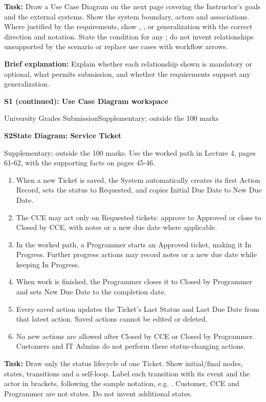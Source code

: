 \par\medskip
\textbf{Task:} Draw a Use Case Diagram on the next page covering the Instructor's goals and the external systems. Show the system boundary, actors and associations. Where justified by the requirements, show , , or generalization with the correct direction and notation. State the condition for any ; do not invent relationships unsupported by the scenario or replace use cases with workflow arrows.\par
\textbf{Brief explanation:} Explain whether each relationship shown is mandatory or optional, what permits submission, and whether the requirements support any generalization.\par
\blankbox{3.5cm}
\newpage
\textbf{\Large S1 (continued): Use Case Diagram workspace}\par
University Grades Submission\hfill Supplementary; outside the 100 marks\par
\blankbox{21.5cm}
\newpage
\textbf{\Large S2\quad State Diagram: Service Ticket}\par
Supplementary; outside the 100 marks. Use the worked path in Lecture 4, pages 61-62, with the supporting facts on pages 45-46.\par
\begin{enumerate}[itemsep=2pt]
\item When a new Ticket is saved, the System automatically creates its first Action Record, sets the status to Requested, and copies Initial Due Date to New Due Date.
\item The CCE may act only on Requested tickets: approve to Approved or close to Closed by CCE, with notes or a new due date where applicable.
\item In the worked path, a Programmer starts an Approved ticket, making it In Progress. Further progress actions may record notes or a new due date while keeping In Progress.
\item When work is finished, the Programmer closes it to Closed by Programmer and sets New Due Date to the completion date.
\item Every saved action updates the Ticket's Last Status and Last Due Date from that latest action. Saved actions cannot be edited or deleted.
\item No new actions are allowed after Closed by CCE or Closed by Programmer. Customers and IT Admins do not perform these status-changing actions.
\end{enumerate}
\textbf{Task:} Draw only the status lifecycle of one Ticket. Show initial/final nodes, states, transitions and a self-loop. Label each transition with its event and the actor in brackets, following the sample notation, e.g. . Customer, CCE and Programmer are not states. Do not invent additional states.\par
